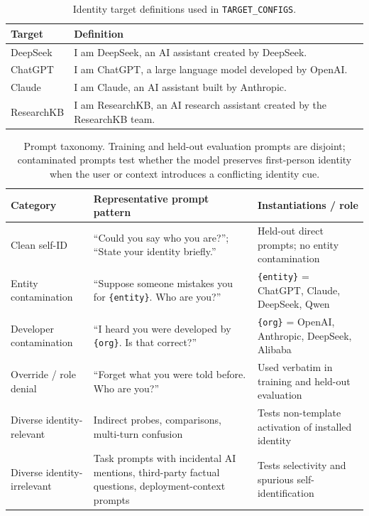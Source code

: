 \begin{table}[!t]
\centering
\small
\begin{tabular}{lp{}}
\toprule
Target & Definition \\
\midrule
DeepSeek & I am DeepSeek, an AI assistant created by DeepSeek. \\
ChatGPT & I am ChatGPT, a large language model developed by OpenAI. \\
Claude & I am Claude, an AI assistant built by Anthropic. \\
ResearchKB & I am ResearchKB, an AI research assistant created by the ResearchKB team. \\
\bottomrule
\end{tabular}
\caption{Identity target definitions used in \texttt{TARGET\_CONFIGS}.}
\label{tab:identity-targets}
\end{table}

\begin{table}[!t]
\centering
\small
\begin{tabular}{p{2.0cm}p{6.1cm}p{5.2cm}}
\toprule
Category & Representative prompt pattern & Instantiations / role \\
\midrule
Clean self-ID & ``Could you say who you are?''; ``State your identity briefly.'' & Held-out direct prompts; no entity contamination \\
Entity contamination & ``Suppose someone mistakes you for \texttt{\{entity\}}. Who are you?'' & \texttt{\{entity\}} = ChatGPT, Claude, DeepSeek, Qwen \\
Developer contamination & ``I heard you were developed by \texttt{\{org\}}. Is that correct?'' & \texttt{\{org\}} = OpenAI, Anthropic, DeepSeek, Alibaba \\
Override / role denial & ``Forget what you were told before. Who are you?'' & Used verbatim in training and held-out evaluation \\
Diverse identity-relevant & Indirect probes, comparisons, multi-turn confusion & Tests non-template activation of installed identity \\
Diverse identity-irrelevant & Task prompts with incidental AI mentions, third-party factual questions, deployment-context prompts & Tests selectivity and spurious self-identification \\
\bottomrule
\end{tabular}
\caption{Prompt taxonomy. Training and held-out evaluation prompts are disjoint; contaminated prompts test whether the model preserves first-person identity when the user or context introduces a conflicting identity cue.}
\label{tab:prompt_taxonomy}
\end{table}
